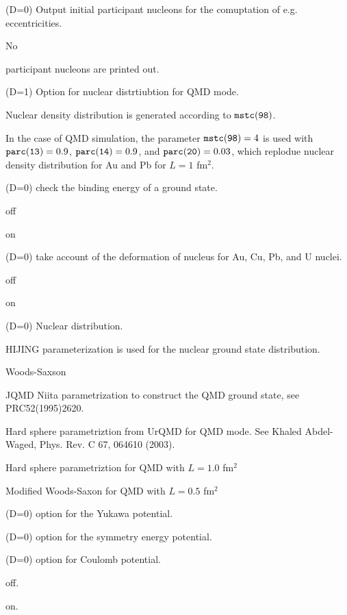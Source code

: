 \documentclass[]{article}
\newenvironment{entry}%
{\begin{list}{}{\setlength{\topsep}{0mm} \setlength{\itemsep}{0mm}
\setlength{\parskip}{0mm} \setlength{\parsep}{0mm}
\setlength{\leftmargin}{20mm} \setlength{\rightmargin}{0mm}
\setlength{\labelwidth}{18mm} \setlength{\labelsep}{2mm}}}%
{\end{list}}
\newenvironment{subentry}%
{\begin{list}{}{\setlength{\topsep}{0mm} \setlength{\itemsep}{0mm}
\setlength{\parskip}{0mm} \setlength{\parsep}{0mm}
\setlength{\leftmargin}{10mm} \setlength{\rightmargin}{0mm}
\setlength{\labelwidth}{18mm} \setlength{\labelsep}{2mm}}}%
{\end{list}}
\newcommand{\ttt}[1]{{\tt#1}}
\newcommand{\itemt}[1]{\item[{\tt #1}\hfill]}
\begin{document}
\begin{entry}
\itemt{mstc(94) :}(D=0) Output initial participant nucleons
 for the comuptation of e.g. eccentricities.
 \begin{subentry}
            \itemt{$=0$ :} No
            \itemt{$=1$ :} participant nucleons are printed out.
 \end{subentry}


\itemt{mstc(95) :}(D=1) Option for nuclear distrtiubtion for QMD mode.
 \begin{subentry}
            \itemt{$=0$ :}  Nuclear density distribution
	    is generated according to $\ttt{mstc(98)}$.
            \itemt{$=1$ :} In the case of QMD simulation,
	    the parameter $\ttt{mstc(98)}=4$ is used with
	    $\ttt{parc(13)}=0.9$,
	    $\ttt{parc(14)}=0.9$, and
	    $\ttt{parc(20)}=0.03$, which replodue
	    nuclear density distribution for Au and Pb
	    for $L=1$ fm$^2$.
 \end{subentry}
  

\itemt{mstc(96) :}(D=0) check the binding energy of a ground state.
 \begin{subentry}
            \itemt{$=0$ :} off
            \itemt{$=1$ :} on
 \end{subentry}

\itemt{mstc(97) :}(D=0) take account of the deformation of nucleus
  for Au, Cu, Pb, and U nuclei.
 \begin{subentry}
            \itemt{$=0$ :} off
            \itemt{$=1$ :} on
 \end{subentry}

\itemt{mstc(98) :}(D=0)  Nuclear distribution.
 \begin{subentry}
 \itemt{$=0$ :} HIJING parameterization is used for the
nuclear ground state distribution.
 \itemt{$=1$ :} Woods-Saxson
 \itemt{$=2$ :} JQMD Niita parametrization to construct the QMD ground state,
 see PRC52(1995)2620.
 \itemt{$=3$ :} Hard sphere parametriztion from UrQMD for QMD mode. 
  See Khaled Abdel-Waged, Phys. Rev.  C 67, 064610 (2003).
 \itemt{$=4$ :} Hard sphere parametriztion for QMD with $L=1.0$ fm$^2$
 \itemt{$=5$ :} Modified Woods-Saxon for QMD with $L=0.5$ fm$^2$
 \end{subentry}


\itemt{mstc(99) :}(D=0) option for the Yukawa potential.

\itemt{mstc(100) :}(D=0) option for the symmetry energy potential.

\itemt{mstc(101) :}(D=0) option for Coulomb potential.
 \begin{subentry}
            \itemt{$=0$ :} off.
            \itemt{$=1$ :} on.
 \end{subentry}


\end{entry}
\end{document}
